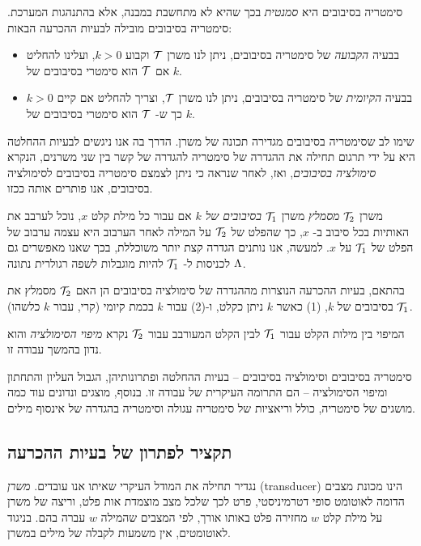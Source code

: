 {סימטריה בסיבובים היא
\emph{סמנטית}
בכך שהיא לא מתחשבת במבנה, אלא בהתנהגות המערכת.
סימטריה בסיבובים מובילה לבעיות ההכרעה הבאות:
\begin{itemize}
\item
בבעיה 
\emph{הקבועה}
של סימטריה בסיבובים, 
ניתן לנו משרן
$\mathcal{T}$ וקבוע $k>0$,
ועלינו להחליט אם
$\mathcal{T}$ 
הוא סימטרי בסיבובים של
$k$.
\item
בבעיה 
\emph{הקיומית}
של סימטריה בסיבובים, 
ניתן לנו משרן
$\mathcal{T}$,
וצריך להחליט אם קיים
$k>0$
כך ש-
$\mathcal{T}$
הוא סימטרי בסיבובים של
$k$.
\end{itemize}

שימו לב שסימטריה בסיבובים מגדירה תכונה של משרן.
הדרך בה אנו ניגשים לבעיות ההחלטה היא על ידי תרגום תחילה את ההגדרה של סימטריה להגדרה של קשר בין שני משרנים, הנקרא
\emph{סימולציה בסיבובים},
ואז, לאחר שנראה כי ניתן לצמצם סימטריה בסיבובים לסימולציה בסיבובים, אנו פותרים אותה ככזו.

משרן
$\mathcal{T}_2$
\emph{מסמלץ}
משרן
$\mathcal{T}_1$
\emph{בסיבובים של
$k$}
אם עבור כל מילת קלט
$x$, 
נוכל לערבב את האותיות בכל סיבוב ב-
$x$,
כך שהפלט של
$\mathcal{T}_2$
על המילה לאחר הערבוב היא עצמה ערבוב של הפלט של
$\mathcal{T}_1$
על
$x$.
למעשה, אנו נותנים הגדרה קצת יותר משוכללת, בכך שאנו מאפשרים גם לכניסות ל-
$\mathcal{T}_1$
להיות מוגבלות לשפה רגולרית נתונה
$\Lambda$.

בהתאם, בעיות ההכרעה הנוצרות מההגדרה של סימולציה בסיבובים הן האם 
$\mathcal{T}_2$
מסמלץ את
$\mathcal{T}_1$
בסיבובים של
$k$,
(1) כאשר
$k$
ניתן כקלט, ו-(2) עבור
$k$
בכמת קיומי (קרי, עבור
$k$
כלשהו).

המיפוי בין מילות הקלט עבור
$\mathcal{T}_1$
לבין הקלט המעורבב עבור
$\mathcal{T}_2$
נקרא
\emph{מיפוי הסימולציה}
והוא נדון בהמשך עבודה זו.

סימטריה בסיבובים וסימולציה בסיבובים 
\textenglish{--}
בעיות ההחלטה ופתרונותיהן, הגבול העליון והתחתון ומיפוי הסימולציה
\textenglish{--}
הם התרומה העיקרית של עבודה זו.
בנוסף, מוצגים ונדונים עוד כמה מושגים של סימטריה, כולל וריאציות של סימטריה עגולה וסימטריה בהגדרה של אינסוף מילים.

\subsection*{\texthebrew{תקציר לפתרון של בעיות ההכרעה}}

נגדיר תחילה את המודל העיקרי שאיתו אנו עובדים.
\emph{משרן}
(\textenglish{transducer})
הינו מכונת מצבים הדומה לאוטומט סופי דטרמיניסטי, פרט לכך שלכל מצב מוצמדת אות פלט, וריצה של משרן על מילת קלט
$w$
מחזירה פלט באותו אורך, לפי המצבים שהמילה
$w$
עברה בהם. בניגוד לאוטומטים, אין משמעות לקבלה של מילים במשרן.

}
